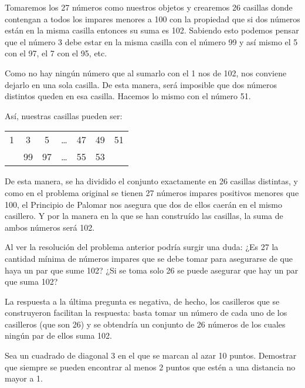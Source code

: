 \begin{solucion}
    Tomaremos los 27 números como nuestros objetos y crearemos 26 casillas donde contengan a todos los impares menores a 100 con la propiedad que si dos números están en la misma casilla entonces su suma es 102. Sabiendo esto podemos pensar que el número 3 debe estar en la misma casilla con el número 99 y así mismo el 5 con el 97, el 7 con el 95, etc.
    
    Como no hay ningún número que al sumarlo con el 1 nos de 102, nos conviene dejarlo en una sola casilla. De esta manera, será imposible que dos números distintos queden en esa casilla. Hacemos lo mismo con el número 51.

    Así, nuestras casillas pueden ser:

    \begin{center}
        \begin{tabular}{|c|c|c|c|c|c|c|}
            \hline
            1 & 3  & 5  & \dots & 47 & 49 & 51 \\
              & 99 & 97 & \dots & 55 & 53 &    \\ \hline
        \end{tabular}
    \end{center}

    De esta manera, se ha dividido el conjunto exactamente en 26 casillas distintas, y como en el problema original se tienen 27 números impares positivos menores que 100, el Principio de Palomar nos asegura que dos de ellos caerán en el mismo casillero.  Y por la manera en la que se han construído las casillas, la suma de ambos números será 102.

    Al ver la resolución del problema anterior podría surgir una duda: ¿Es 27 la cantidad mínima de números impares que se debe tomar para asegurarse de que haya un par que sume 102? ¿Si se toma solo 26 se puede asegurar que hay un par que suma 102?
    
    La respuesta a la última pregunta es negativa, de hecho, los casilleros que se construyeron facilitan la respuesta: basta tomar un número de cada uno de los casilleros (que son 26) y se obtendría un conjunto de 26 números de los cuales ningún par de ellos suma 102.
    
\end{solucion}

\begin{ejemplo}
    Sea un cuadrado de diagonal 3 en el que se marcan al azar 10 puntos. Demostrar que siempre se pueden encontrar al menos 2 puntos que estén a una distancia no mayor a 1.
\end{ejemplo}

